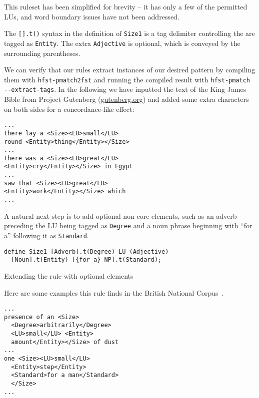 \documentclass{llncs}
\begin{document}
This ruleset has been simplified for brevity -- it has only a few of the
permitted LUs, and word boundary issues have not been addressed.

The \verb+[].t()+ syntax in the definition of \verb+Size1+ is a tag delimiter
controlling the are tagged as \verb+Entity+. The extra \verb+Adjective+ is
optional, which is conveyed by the surrounding parentheses.

We can verify that our rules extract instances of our desired pattern by compiling
them with \verb+hfst-pmatch2fst+ and running the compiled result with
\verb+hfst-pmatch --extract-tags+. In the following we have
inputted the text of the King James Bible from Project
Gutenberg (\url{gutenberg.org}) and added some extra characters on both
sides for
a concordance-like effect:

\hfill \break
  \small
  \begin{framed}
\begin{verbatim}
...
there lay a <Size><LU>small</LU>
round <Entity>thing</Entity></Size>
...
there was a <Size><LU>great</LU>
<Entity>cry</Entity></Size> in Egypt
...
saw that <Size><LU>great</LU>
<Entity>work</Entity></Size> which
...
\end{verbatim}
\end{framed}
\normalsize

A natural next step is to add optional non-core elements, such as an adverb
preceding the LU being tagged as \verb+Degree+ and a noun phrase beginning with
``for a'' following it as \verb+Standard+.

\begin{table}[h]
  \small
  \begin{framed}
\begin{verbatim}
define Size1 [Adverb].t(Degree) LU (Adjective)
  [Noun].t(Entity) [{for a} NP].t(Standard);
\end{verbatim}
\end{framed}
\normalsize
\caption{Extending the rule with optional elements}
\end{table}

Here are some examples this rule finds in the British National
Corpus~\cite{bnc}.

  \small
  \begin{framed}
\begin{verbatim}
...
presence of an <Size>
  <Degree>arbitrarily</Degree>
  <LU>small</LU> <Entity>
  amount</Entity></Size> of dust
...
one <Size><LU>small</LU>
  <Entity>step</Entity>
  <Standard>for a man</Standard>
  </Size>
...
\end{verbatim}
  \end{framed}
  \normalsize
\end{document}

